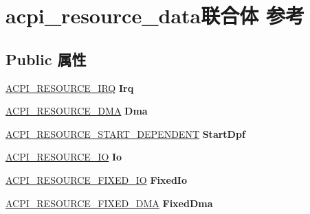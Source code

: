 \hypertarget{unionacpi__resource__data}{}\section{acpi\+\_\+resource\+\_\+data联合体 参考}
\label{unionacpi__resource__data}
\subsection*{Public 属性}
\begin{DoxyCompactItemize}
\item 
\mbox{\label{unionacpi__resource__data_abe62388a6866d5d27a3cce0fa23d2477}} 
\hyperlink{structacpi__resource__irq}{A\+C\+P\+I\+\_\+\+R\+E\+S\+O\+U\+R\+C\+E\+\_\+\+I\+RQ} {\bfseries Irq}
\item 
\mbox{\label{unionacpi__resource__data_a9a93fae0e42a46f153f6f187327924fe}} 
\hyperlink{structacpi__resource__dma}{A\+C\+P\+I\+\_\+\+R\+E\+S\+O\+U\+R\+C\+E\+\_\+\+D\+MA} {\bfseries Dma}
\item 
\mbox{\label{unionacpi__resource__data_ab4d895d2d596e57081fb8365fc76a638}} 
\hyperlink{structacpi__resource__start__dependent}{A\+C\+P\+I\+\_\+\+R\+E\+S\+O\+U\+R\+C\+E\+\_\+\+S\+T\+A\+R\+T\+\_\+\+D\+E\+P\+E\+N\+D\+E\+NT} {\bfseries Start\+Dpf}
\item 
\mbox{\label{unionacpi__resource__data_acf5e9a8312843f9ebc5ae70dfbd71f7e}} 
\hyperlink{structacpi__resource__io}{A\+C\+P\+I\+\_\+\+R\+E\+S\+O\+U\+R\+C\+E\+\_\+\+IO} {\bfseries Io}
\item 
\mbox{\label{unionacpi__resource__data_a441687e849fdb863466ca2f4e441990a}} 
\hyperlink{structacpi__resource__fixed__io}{A\+C\+P\+I\+\_\+\+R\+E\+S\+O\+U\+R\+C\+E\+\_\+\+F\+I\+X\+E\+D\+\_\+\+IO} {\bfseries Fixed\+Io}
\item 
\mbox{\label{unionacpi__resource__data_a50819ce3834a8c0992794c333dee7032}} 
\hyperlink{structacpi__resource__fixed__dma}{A\+C\+P\+I\+\_\+\+R\+E\+S\+O\+U\+R\+C\+E\+\_\+\+F\+I\+X\+E\+D\+\_\+\+D\+MA} {\bfseries Fixed\+Dma}
\item 

\end{DoxyCompactItemize}
